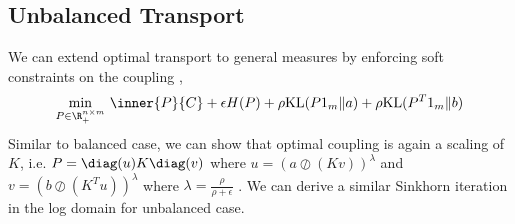 \documentclass[11pt]{article}
\begin{document}
\subsection{Unbalanced Transport}

We can extend optimal transport to general measures by enforcing soft constraints on the coupling \cite{chizatScalingAlgorithmsUnbalanced2017},
\begin{align}
    \min_{P\in\R^{n\times m}_+}\, 
        \inner{P}{C} + \epsilon H(P) + \rho \text{KL}(P1_m \Vert a) + \rho \text{KL}(P^T 1_m \Vert b)
\end{align}
Similar to balanced case, we can show that optimal coupling is again a scaling of $K$, i.e. $P = \diag(u) K \diag(v)$ where $u = (a \oslash (Kv))^{\lambda}$ and $v = (b \oslash (K^T u))^{\lambda}$ where $\lambda = \frac{\rho}{\rho + \epsilon}$ \cite{frognerLearningWassersteinLoss2015}. We can derive a similar Sinkhorn iteration in the log domain for unbalanced case.








\newpage
\printbibliography 
\end{document}

